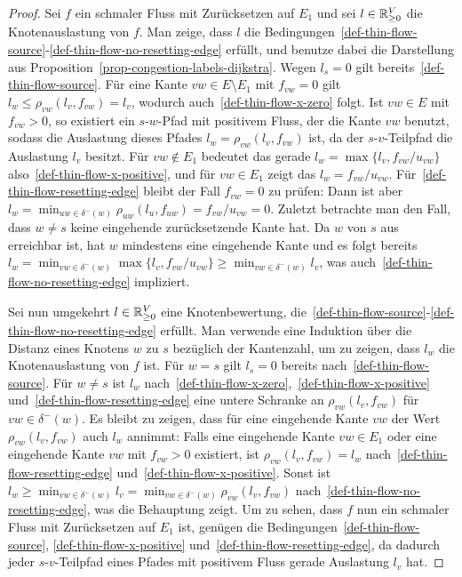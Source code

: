 \begin{proof}
	Sei $f$ ein schmaler Fluss mit Zurücksetzen auf $E_1$ und sei $l\in\mathbb{R}_{\geq 0}^V$ die Knotenauslastung von $f$.
	Man zeige, dass $l$ die Bedingungen~\ref{def-thin-flow-source}-\ref{def-thin-flow-no-resetting-edge} erfüllt, und benutze dabei die Darstellung aus Proposition~\ref{prop-congestion-labels-dijkstra}.
	Wegen $l_s = 0$ gilt bereits~\ref{def-thin-flow-source}.
	Für eine Kante $vw\in E\setminus E_1$ mit $f_{vw}=0$ gilt $l_w\leq \rho_{vw}(l_v, f_{vw}) = l_v$, wodurch auch~\ref{def-thin-flow-x-zero} folgt.
	Ist $vw\in E$ mit $f_{vw} > 0$, so existiert ein $s$-$w$-Pfad mit positivem Fluss, der die Kante $vw$ benutzt, sodass die Auslastung dieses Pfades $l_w=\rho_{vw}(l_v, f_{vw})$ ist, da der $s$-$v$-Teilpfad die Auslastung $l_v$ besitzt.
	Für $vw\notin E_1$ bedeutet das gerade $l_w = \max\{ l_v, f_{vw}/u_{vw} \}$ also~\ref{def-thin-flow-x-positive}, und für $vw\in E_1$ zeigt das $l_w = f_{vw} / u_{vw}$.
	Für~\ref{def-thin-flow-resetting-edge} bleibt der Fall $f_{vw} = 0$ zu prüfen:
	Dann ist aber $l_w = \min_{uw\in\delta^-(w)} \rho_{uw}(l_u, f_{uw}) = f_{vw} / u_{vw} = 0$.
	Zuletzt betrachte man den Fall, dass $w\neq s$ keine eingehende zurücksetzende Kante hat.
	Da $w$ von $s$ aus erreichbar ist, hat $w$ mindestens eine eingehende Kante und es folgt bereits $l_w = \min_{vw\in \delta^-(w)} \max\{ l_v, f_{vw} / u_{vw} \} \geq \min_{vw\in\delta^-(w)} l_v$, was auch~\ref{def-thin-flow-no-resetting-edge} impliziert.
	
	Sei nun umgekehrt $l\in\mathbb{R}_{\geq 0}^V$ eine Knotenbewertung, die~\ref{def-thin-flow-source}-\ref{def-thin-flow-no-resetting-edge} erfüllt.
	Man verwende eine Induktion über die Distanz eines Knotens $w$ zu $s$ bezüglich der Kantenzahl, um zu zeigen, dass $l_w$ die Knotenauslastung von  $f$ ist.
	Für $w=s$ gilt $l_s=0$ bereits nach~\ref{def-thin-flow-source}.
	Für $w\neq s$ ist $l_w$ nach~\ref{def-thin-flow-x-zero},~\ref{def-thin-flow-x-positive} und~\ref{def-thin-flow-resetting-edge} eine untere Schranke an $\rho_{vw}(l_v, f_{vw})$ für $vw\in\delta^-(w)$.
	Es bleibt zu zeigen, dass für eine eingehende Kante $vw$ der Wert $\rho_{vw}(l_v, f_{vw})$ auch $l_w$ annimmt:
	Falls eine eingehende Kante $vw\in E_1$ oder eine eingehende Kante $vw$ mit $f_{vw} > 0$ existiert, ist $\rho_{vw}(l_v, f_{vw}) = l_w$ nach~\ref{def-thin-flow-resetting-edge} und~\ref{def-thin-flow-x-positive}.
	Sonst ist $l_w\geq \min_{vw\in \delta^-(w)} l_v = \min_{vw\in \delta^-(w)} \rho_{vw}(l_v, f_{vw})$ nach~\ref{def-thin-flow-no-resetting-edge}, was die Behauptung zeigt.
	Um zu sehen, dass $f$ nun ein schmaler Fluss mit Zurücksetzen auf $E_1$ ist, genügen die Bedingungen~\ref{def-thin-flow-source}, \ref{def-thin-flow-x-positive} und~\ref{def-thin-flow-resetting-edge}, da dadurch jeder $s$-$v$-Teilpfad eines Pfades mit positivem Fluss gerade Auslastung $l_v$ hat.
\end{proof}


